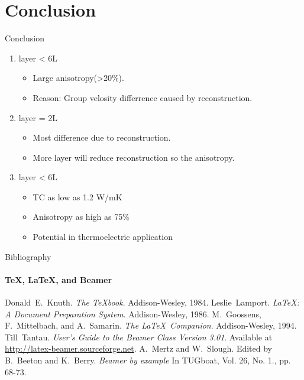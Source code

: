 \documentclass{beamer}
\begin{document}
\section{Conclusion}
\begin{frame}[label=lists]{Conclusion}

  \begin{enumerate}
    \item layer < 6L
          \begin{itemize}
            \item Large anisotropy(>20\%).
          \end{itemize}
          \begin{itemize}
            \item Reason: Group velosity differrence caused by reconstruction.
          \end{itemize}
    \item layer = 2L
          \begin{itemize}
            \item Most difference due to reconstruction.
          \end{itemize}
          \begin{itemize}
            \item More layer will reduce reconstruction so the anisotropy.
          \end{itemize}
    \item layer < 6L
          \begin{itemize}
            \item TC as low as 1.2 W/mK
          \end{itemize}
          \begin{itemize}
            \item Anisotropy as high as 75\%
          \end{itemize}

          \begin{itemize}
            \item Potential in thermoelectric application
          \end{itemize}
  \end{enumerate}
  \bigskip
  \justifying

\end{frame}


\begin{frame}[label=bibliography]{Bibliography}
  \framesubtitle{\TeX, \LaTeX, and Beamer}
  \begin{thebibliography}{9}
    Donald~E.~Knuth.
    \emph{The \TeX book}.
    Addison-Wesley, 1984.
    Leslie~Lamport.
    \emph{\LaTeX : A Document Preparation System}.
    Addison-Wesley, 1986.
    M.~Goossens, F.~Mittelbach, and A.~Samarin.
    \emph{The \LaTeX\ Companion}.
    Addison-Wesley, 1994.
    Till~Tantau.
    \emph{User's Guide to the Beamer Class Version 3.01}.
    Available at \url{http://latex-beamer.sourceforge.net}.
    A.~Mertz and W.~Slough.
    Edited by B.~Beeton and K.~Berry.
    \emph{Beamer by example} In TUGboat,
    Vol. 26, No. 1., pp. 68-73.
  \end{thebibliography}
\end{frame}
\end{document}
